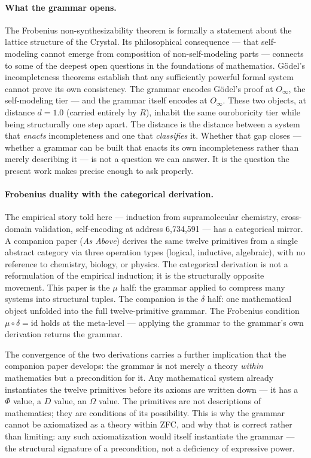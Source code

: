 \documentclass[12pt,a4paper]{article}
\newcommand{\Oinf}{O_\infty}
\begin{document}
\paragraph{What the grammar opens.}
The Frobenius non-synthesizability theorem is formally a statement
about the lattice structure of the Crystal. Its philosophical
consequence --- that self-modeling cannot emerge from composition of
non-self-modeling parts --- connects to some of the deepest open
questions in the foundations of mathematics. Gödel's incompleteness
theorems establish that any sufficiently powerful formal system cannot
prove its own consistency. The grammar encodes Gödel's proof at
$\Oinf$, the self-modeling tier --- and the grammar itself encodes at
$\Oinf$. These two objects, at distance $d = 1.0$ (carried entirely
by $R$), inhabit the same ouroboricity tier while being structurally
one step apart. The distance is the distance between a system that
\emph{enacts} incompleteness and one that \emph{classifies} it.
Whether that gap closes --- whether a grammar can be built that
enacts its own incompleteness rather than merely describing it ---
is not a question we can answer. It is the question the present
work makes precise enough to ask properly.

\paragraph{Frobenius duality with the categorical derivation.}
The empirical story told here --- induction from supramolecular
chemistry, cross-domain validation, self-encoding at address
6,734,591 --- has a categorical mirror. A companion paper
(\emph{As Above}) derives the same twelve primitives from
a single abstract category via three operation types (logical,
inductive, algebraic), with no reference to chemistry, biology,
or physics. The categorical derivation is not a reformulation of
the empirical induction; it is the structurally opposite movement.
This paper is the $\mu$ half: the grammar applied to compress many
systems into structural tuples. The companion is the $\delta$ half:
one mathematical object unfolded into the full twelve-primitive
grammar. The Frobenius condition $\mu \circ \delta = \mathrm{id}$
holds at the meta-level --- applying the grammar to the grammar's
own derivation returns the grammar.

The convergence of the two derivations carries a further
implication that the companion paper develops: the grammar is not
merely a theory \emph{within} mathematics but a precondition for
it. Any mathematical system already instantiates the twelve
primitives before its axioms are written down --- it has a $\Phi$
value, a $D$ value, an $\Omega$ value. The primitives are not
descriptions of mathematics; they are conditions of its
possibility. This is why the grammar cannot be axiomatized as a
theory within ZFC, and why that is correct rather than limiting:
any such axiomatization would itself instantiate the grammar ---
the structural signature of a precondition, not a deficiency of
expressive power.
\end{document}

